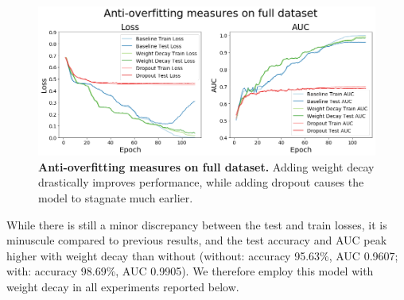 \begin{figure}[!htb]
\centering
\includegraphics[width=\linewidth]{ch-results/figures/baseline/full_dataset_anti_overfitting.png}
\caption{{\bf Anti-overfitting measures on full dataset.} Adding weight decay drastically improves performance, while adding dropout causes the model to stagnate much earlier.}
\label{fig:results-baseline-anti-overfitting}
\end{figure}

While there is still a minor discrepancy between the test and train losses, it is minuscule compared to previous results, and the test accuracy and AUC peak higher with weight decay than without (without: accuracy 95.63\%, AUC 0.9607; with: accuracy 98.69\%, AUC 0.9905). We therefore employ this model with weight decay in all experiments reported below.
